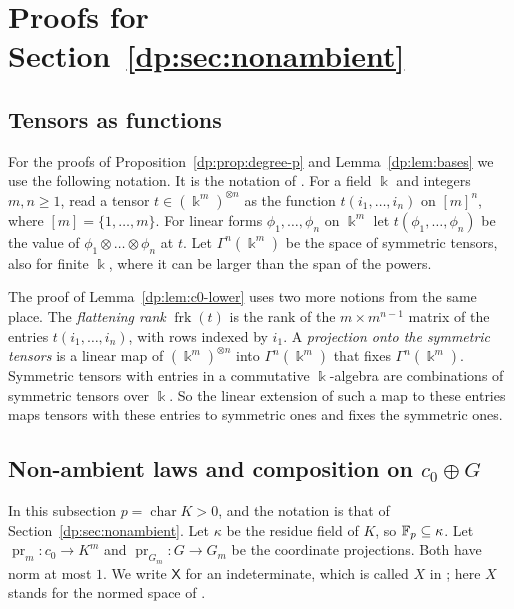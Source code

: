 \section{Proofs for Section~\ref{dp:sec:nonambient}}\label{dp:app:proofs}

\subsection{Tensors as functions}\label{dp:ssec:tensor-notation}

For the proofs of Proposition~\ref{dp:prop:degree-p} and Lemma~\ref{dp:lem:bases} we use the following notation. It is the notation of \cite[Section~Q.5]{I}. For a field $\Bbbk$ and integers $m,n\ge1$, read a tensor $t\in(\Bbbk^m)^{\otimes n}$ as the function $t(i_1,\dots,i_n)$ on $[m]^n$, where $[m]=\{1,\dots,m\}$. For linear forms $\phi_1,\dots,\phi_n$ on $\Bbbk^m$ let $t(\phi_1,\dots,\phi_n)$ be the value of $\phi_1\otimes\dots\otimes\phi_n$ at $t$. Let $\Gamma^n(\Bbbk^m)$ be the space of symmetric tensors, also for finite $\Bbbk$, where it can be larger than the span of the powers.

The proof of Lemma~\ref{dp:lem:c0-lower} uses two more notions from the same place. The \emph{flattening rank} $\operatorname{frk}(t)$ is the rank of the $m\times m^{n-1}$ matrix of the entries $t(i_1,\dots,i_n)$, with rows indexed by $i_1$. A \emph{projection onto the symmetric tensors} is a linear map of $(\Bbbk^m)^{\otimes n}$ into $\Gamma^n(\Bbbk^m)$ that fixes $\Gamma^n(\Bbbk^m)$. Symmetric tensors with entries in a commutative $\Bbbk$\nobreakdash-algebra are combinations of symmetric tensors over $\Bbbk$. So the linear extension of such a map to these entries maps tensors with these entries to symmetric ones and fixes the symmetric ones.

\subsection{Non-ambient laws and composition on \texorpdfstring{$c_0\oplus G$}{c0+G}}\label{dp:af:c0}

In this subsection $p=\operatorname{char}K>0$, and the notation is that of Section~\ref{dp:sec:nonambient}. Let $\kappa$ be the residue field of $K$, so $\mathbb F_p\subseteq\kappa$. Let $\operatorname{pr}_m\colon c_0\to K^m$ and $\operatorname{pr}_{G_m}\colon G\to G_m$ be the coordinate projections. Both have norm at most $1$. We write $\mathsf X$ for an indeterminate, which is called $X$ in \cite[Appendix~K]{I}; here $X$ stands for the normed space of \cite[Definition~14.15]{I}.

